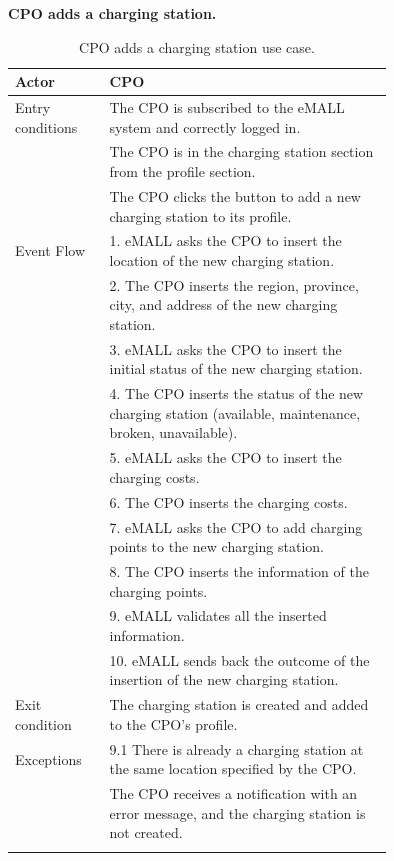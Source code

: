 \textbf{CPO adds a charging station.}
\begin{center}
    \begin{longtable}{lp{0.75\linewidth}}
        \hline
        Actor            & CPO                                                                                                      \\
        \hline
        Entry conditions & The CPO is subscribed to the eMALL system and correctly logged in.                                       \\
        & The CPO is in the charging station section from the profile section.                                     \\
        & The CPO clicks the button to add a new charging station to its profile.                                  \\
        \hline
        Event Flow       & 1. eMALL asks the CPO to insert the location of the new charging station.                                \\
        & 2. The CPO inserts the region, province, city, and address of the new charging station.                  \\
        & 3. eMALL asks the CPO to insert the initial status of the new charging station.                          \\
        & 4. The CPO inserts the status of the new charging station (available, maintenance, broken, unavailable). \\
        & 5. eMALL asks the CPO to insert the charging costs.                                                      \\
        & 6. The CPO inserts the charging costs.                                                                   \\
        & 7. eMALL asks the CPO to add charging points to the new charging station.                                \\
        & 8. The CPO inserts the information of the charging points.                                               \\
        & 9. eMALL validates all the inserted information.                                                         \\
        & 10. eMALL sends back the outcome of the insertion of the new charging station.                           \\
        \hline
        Exit condition   & The charging station is created and added to the CPO’s profile.                                          \\
        \hline
        Exceptions       & 9.1 There is already a charging station at the same location specified by the CPO.                       \\
        & The CPO receives a notification with an error message, and the charging station is not created.          \\
        \hline
        \caption{CPO adds a charging station use case.}
        \label{tab: CPO_adds_charging_station_use_case}
    \end{longtable}
\end{center}

